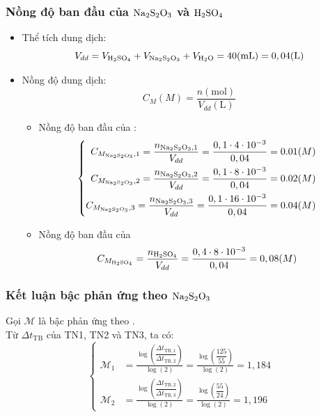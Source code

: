 \subsubsection{Nồng độ ban đầu của \(\ce{Na2S2O3}\) và \(\ce{H2SO4}\)}
\begin{itemize}
    \item Thể tích dung dịch: \begin{equation}
        V_{dd} = V_{\ce{H2SO4}} + V_{\ce{Na2S2O3}} + V_{\ce{H2O}} = 40 (\si{\milli\liter}) = 0,04 (\si{\liter})
    \end{equation}
    \item Nồng độ dung dịch: \begin{equation}
        C_M(M) = \frac{n (\si{\mole})}{V_{dd}(\si{\liter})}
    \end{equation}
    \begin{itemize}
        \item Nồng độ ban đầu của :
        \begin{equation}
            \left\{
            \begin{aligned}
                C_{M_{\ce{Na2S2O3}},1} = \frac{n_{\ce{Na2S2O3}, 1}}{V_{dd}} = \frac{0,1 \cdot 4\cdot 10^{-3}}{0,04} = 0.01 (M) \\
                C_{M_{\ce{Na2S2O3}},2} = \frac{n_{\ce{Na2S2O3}, 2}}{V_{dd}} = \frac{0,1 \cdot 8\cdot 10^{-3}}{0,04} = 0.02 (M) \\
                C_{M_{\ce{Na2S2O3}},3} = \frac{n_{\ce{Na2S2O3}, 3}}{V_{dd}} = \frac{0,1 \cdot 16\cdot 10^{-3}}{0,04} = 0.04 (M)
            \end{aligned}
            \right.
        \end{equation}
        \item Nồng độ ban đầu của 
        \begin{equation}
            C_{M_{\ce{H2SO4}}} = \frac{n_{\ce{H2SO4}}}{V_{dd}} = \frac{0,4 \cdot 8 \cdot 10^{-3}}{0,04} = 0,08 (M)
        \end{equation}
    \end{itemize}
\end{itemize}

\subsubsection{Kết luận bậc phản ứng theo \(\ce{Na2S2O3}\)}
Gọi \(\mathcal{M}\) là bậc phản ứng theo . \\
Từ $\Delta t_{\mathrm{TB}}$ của TN1, TN2 và TN3, ta có:
\begin{equation}
    \left\{
    \begin{aligned}
        \mathcal{M}_1 &= \frac{\log\left(\dfrac{\Delta t_{\mathrm{TB},1}}{\Delta t_{\mathrm{TB},2}}\right)}{\log(2)} = \frac{\log\left(\dfrac{125}{55}\right)}{\log(2)} = 1{,}184 \\
        \mathcal{M}_2 &= \frac{\log\left(\dfrac{\Delta t_{\mathrm{TB},2}}{\Delta t_{\mathrm{TB},3}}\right)}{\log(2)} = \frac{\log\left(\dfrac{55}{24}\right)}{\log(2)} = 1{,}196
    \end{aligned}
    \right.
\end{equation}

